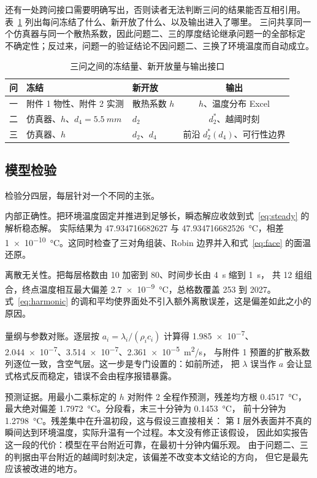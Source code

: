 \documentclass[withoutpreface,bwprint]{cumcmthesis}
\begin{document}
还有一处跨问接口需要明确写出，否则读者无法判断三问的结果能否互相引用。
表~\ref{tab:iface} 列出每问冻结了什么、新开放了什么、以及输出进入了哪里。
三问共享同一个仿真器与同一个散热系数，因此问题二、三的厚度结论继承问题一的全部标定
不确定性；反过来，问题一的验证结论不因问题二、三换了环境温度而自动成立。

\begin{table}[htbp]
  \centering
  \caption{三问之间的冻结量、新开放量与输出接口}
  \label{tab:iface}
  \begin{tabular}{cllc}
    \toprule
    问 & 冻结 & 新开放 & 输出 \\
    \midrule
    一 & 附件 1 物性、附件 2 实测 & 散热系数 $h$ & $h$、温度分布 Excel \\
    二 & 仿真器、$h$、$d_4=\SI{5.5}{mm}$ & $d_2$ & $d_2^{*}$、越阈时刻 \\
    三 & 仿真器、$h$ & $d_2$、$d_4$ & 前沿 $d_2^{*}(d_4)$、可行性边界 \\
    \bottomrule
  \end{tabular}
\end{table}

\subsection{模型检验}

检验分四层，每层针对一个不同的主张。

内部正确性。把环境温度固定并推进到足够长，瞬态解应收敛到式~\eqref{eq:steady} 的解析稳态解。
实际结果为 \num{47.934716682627} 与 \SI{47.934716682526}{\celsius}，相差
\SI{1e-10}{\celsius}。这同时检查了三对角组装、Robin 边界并入和式~\eqref{eq:face} 的面温还原。

离散无关性。把每层格数由 10 加密到 80、时间步长由 \SI{4}{s} 缩到 \SI{1}{s}，
共 12 组组合，终点温度相互最大偏差 \SI{2.7e-9}{\celsius}，总格数覆盖 253 到 2027。
式~\eqref{eq:harmonic} 的调和平均使界面处不引入额外离散误差，这是偏差如此之小的原因。

量纲与参数对账。逐层按 $a_i=\lambda_i/(\rho_i c_i)$ 计算得
\SI{1.985e-7}{}、\SI{2.044e-7}{}、\SI{3.514e-7}{}、\SI{2.361e-5}{m^2/s}，
与附件 1 预置的扩散系数列逐位一致，含空气层。这一步是专门设置的：如前所述，
把 $\lambda$ 误当作 $a$ 会让显式格式反而稳定，错误不会由程序报错暴露。

预测证据。用最小二乘标定的 $h$ 对附件 2 全程作预测，残差均方根 \SI{0.4517}{\celsius}，
最大绝对偏差 \SI{1.7972}{\celsius}。分段看，末三十分钟为 \SI{0.1453}{\celsius}，
前十分钟为 \SI{1.2798}{\celsius}。残差集中在升温初段，这与假设三直接相关：
第 I 层外表面并不真的瞬间达到环境温度，实际升温有一个过程。本文没有修正该假设，
因此如实报告这一段的代价：模型在平台附近可靠，在最初十分钟内偏乐观。
由于问题二、三的判据由平台附近的越阈时刻决定，该偏差不改变本文结论的方向，
但它是最先应该被改进的地方。
\end{document}

